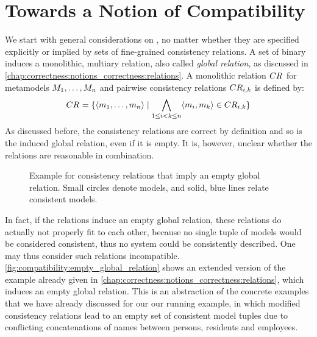 \section{Towards a Notion of Compatibility}
\label{chap:compatibility:informal}

We start with general considerations on \modellevelconsistencyrelations, no matter whether they are specified explicitly or implied by sets of fine-grained consistency relations.
A set of binary \modellevelconsistencyrelations induces a monolithic, multiary relation, also called \emph{global relation}, as discussed in \autoref{chap:correctness:notions_correctness:relations}.
A monolithic relation $\consistencyrelation{CR}{}$ for metamodels $\metamodelsequence{M}{n}$ and pairwise consistency relations $\consistencyrelation{CR}{i,k}$ is defined by:
\begin{align*}
    \consistencyrelation{CR}{} = \setted{\tupled{\model{m}{1}, \dots, \model{m}{n}} \mid \bigwedge\limits_{1 \le i < k \le n} \tupled{\model{m}{i}, \model{m}{k}} \in \consistencyrelation{CR}{i,k}}
\end{align*}
As discussed before, the consistency relations are correct by definition and so is the induced global relation, even if it is empty.
It is, however, unclear whether the relations are reasonable in combination.

\begin{figure}
    \centering
    
    \caption[Consistency relations that imply an empty global relation]{Example for consistency relations that imply an empty global relation. Small circles denote models, and solid, blue lines relate consistent models.}
    \label{fig:compatibility:empty_global_relation}
\end{figure}

In fact, if the relations induce an empty global relation, these relations do actually not properly fit to each other, because no single tuple of models would be considered consistent, thus no system could be consistently described.
One may thus consider such relations incompatible.
\autoref{fig:compatibility:empty_global_relation} shows an extended version of the example already given in \autoref{chap:correctness:notions_correctness:relations}, which induces an empty global relation.
This is an abstraction of the concrete examples that we have already discussed for our our running example, in which modified consistency relations lead to an empty set of consistent model tuples due to conflicting concatenations of names between persons, residents and employees.

